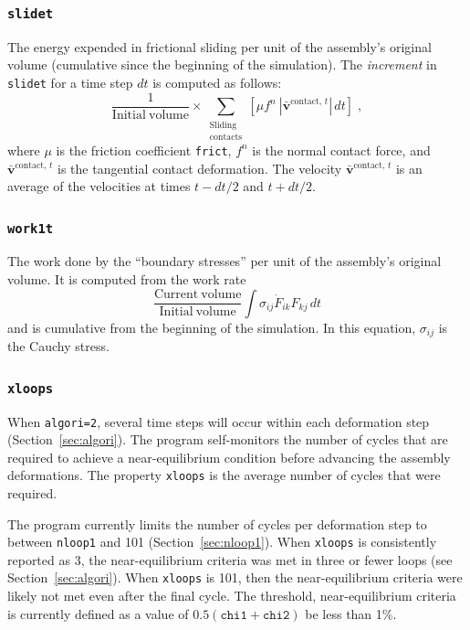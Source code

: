 \documentclass[letterpaper,11pt]{article}
\begin{document}
\subsubsection{\texttt{slidet}}
The energy expended in frictional sliding per unit of the
assembly's original volume
(cumulative since the beginning of the simulation).
The \emph{increment} in \texttt{slidet} for a time step $dt$
is computed as follows:
\begin{equation}
\frac{1}{\mathrm{Initial\ volume}}
\times
\sum_{\substack{\text{Sliding}\\ \text{contacts}}} \left[
\mu f^{n} \: |\bar{\mathbf{v}}^{\text{contact, }t}|\,dt
\right]\;,
\end{equation}
where $\mu$ is the friction coefficient \texttt{frict},
$f^{n}$ is the normal contact force, and
$\bar{\mathbf{v}}^{\text{contact, }t}$ is the tangential contact
deformation.
The velocity $\bar{\mathbf{v}}^{\text{contact, }t}$
is an average of the velocities at times $t-dt/2$ and $t+dt/2$.
%
\subsubsection{\texttt{work1t}}
The work done by the ``boundary stresses'' per unit of the assembly's
original volume. 
It is computed from the work rate
\begin{equation}
\frac{\mathrm{Current\ volume}}{\mathrm{Initial\ volume}}
\int \sigma_{ij} \dot{F}_{ik} F_{kj}\,dt
\end{equation}
and is cumulative from the beginning of the simulation.
In this equation, $\sigma_{ij}$ is the Cauchy stress.
%
\subsubsection{\texttt{xloops}}\label{sec:xloops}
When \texttt{algori=2}, several time steps will occur 
within each deformation step (Section~\ref{sec:algori}).
The program self-monitors the number of cycles 
that are required to achieve a near-equilibrium
condition before advancing the assembly deformations.
The property \texttt{xloops} is the average number of cycles that
were required.
\par
The program currently limits the number of cycles
per deformation step to between \texttt{nloop1} and 101
(Section~\ref{sec:nloop1}).
When \texttt{xloops} is consistently reported as 3,
the near-equilibrium criteria was met in three or fewer loops
(see Section~\ref{sec:algori}).
When \texttt{xloops} is 101, then the near-equilibrium criteria
were likely not met even after the final cycle.
The threshold, near-equilibrium criteria is currently defined as a value
of $0.5(\mathtt{chi1} + \mathtt{chi2})$ be less than 1\%.
%
\end{document}
